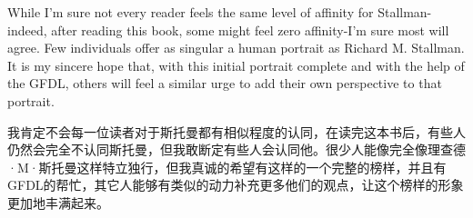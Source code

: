 \ifdefined\eng
While I'm sure not every reader feels the same level of affinity for Stallman-indeed, after reading this book, some might feel zero affinity-I'm sure most will agree. Few individuals offer as singular a human portrait as Richard M. Stallman. It is my sincere hope that, with this initial portrait complete and with the help of the GFDL, others will feel a similar urge to add their own perspective to that portrait.
\fi

\ifdefined\chs
我肯定不会每一位读者对于斯托曼都有相似程度的认同，在读完这本书后，有些人仍然会完全不认同斯托曼，但我敢断定有些人会认同他。很少人能像完全像理查德·M·斯托曼这样特立独行，但我真诚的希望有这样的一个完整的榜样，并且有GFDL的帮忙，其它人能够有类似的动力补充更多他们的观点，让这个榜样的形象更加地丰满起来。
\fi

\theendnotes
\setcounter{endnote}{0}

